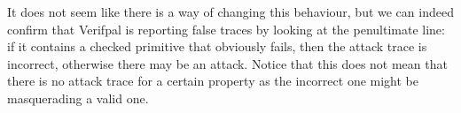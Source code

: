 It does not seem like there is a way of changing this behaviour, but we can indeed confirm that Verifpal is reporting false traces by looking at the penultimate line: if it contains a checked primitive that obviously fails, then the attack trace is incorrect, otherwise there may be an attack. Notice that this does not mean that there is no attack trace for a certain property as the incorrect one might be masquerading a valid one.